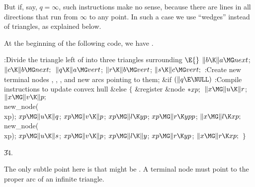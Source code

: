 But if, say, $q=\infty$, such instructions make no sense,
because there are lines in all directions that run from $\infty$ to any point.
In such a case we use ``wedges'' instead of triangles, as explained below.

At the beginning of the following code, we have .

\Y\B\4:Divide the triangle left of  into three triangles
surrounding \X${}\E{}$\6
$\|b\K\|a\MG\\{next}{}$;\5
${}\|c\K\|b\MG\\{next};{}$\6
${}\|q\K\|a\MG\\{vert}{}$;\5
${}\|r\K\|b\MG\\{vert}{}$;\5
${}\|s\K\|c\MG\\{vert};{}$\6
:Create new terminal nodes , , , and new
arcs pointing to them\X;\6
\&{if} ${}(\|q\E\NULL)$ :Compile instructions to update convex hull\X \6
\&{else}\5
${}\{{}$\5
\1\&{register} \&{node} ${}{*}\\{xp};{}$\7
${}\|x\MG\|u\K\|r{}$;\5
${}\|x\MG\|v\K\|p;{}$\6
\\{new\_node}(\\{xp});\6
${}\\{xp}\MG\|u\K\|q{}$;\5
${}\\{xp}\MG\|v\K\|p{}$;\5
${}\\{xp}\MG\|l\K\\{yp}{}$;\5
${}\\{xp}\MG\|r\K\\{ypp}{}$;\6
${}\|x\MG\|l\K\\{xp};{}$\6
\\{new\_node}(\\{xp});\6
${}\\{xp}\MG\|u\K\|s{}$;\5
${}\\{xp}\MG\|v\K\|p{}$;\5
${}\\{xp}\MG\|l\K\|y{}$;\5
${}\\{xp}\MG\|r\K\\{yp}{}$;\6
${}\|x\MG\|r\K\\{xp};{}$\6
\4${}\}{}$\2\par
\U34.\fi

The only subtle point here is that  might be %
\PB{$\NULL$}. A terminal
node must point to the proper arc of an infinite triangle.

